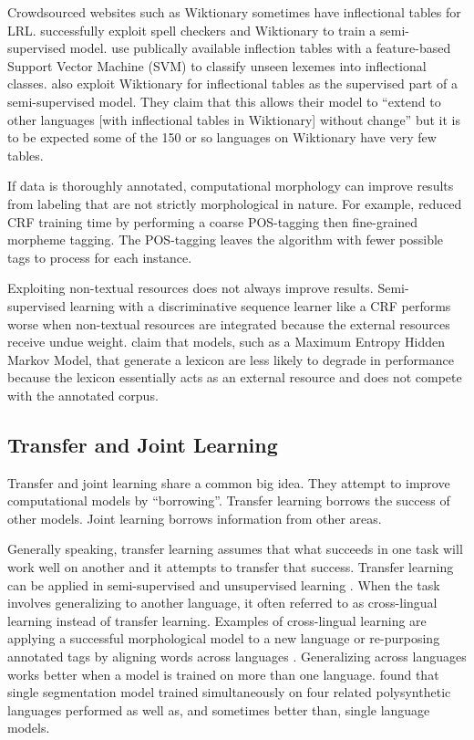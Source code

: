 \documentclass[12pt]{article}
\begin{document}
Crowdsourced websites such as Wiktionary sometimes have inflectional tables for LRL.  successfully exploit spell checkers and Wiktionary to train a semi-supervised model.  use publically available inflection tables with a feature-based Support Vector Machine (SVM) to classify unseen lexemes into inflectional classes.  also exploit Wiktionary for inflectional tables as the supervised part of a semi-supervised model. They claim that this allows their model to ``extend to other languages [with inflectional tables in Wiktionary] without change'' but it is to be expected some of the 150 or so languages on Wiktionary have very few tables. 

If data is thoroughly annotated, computational morphology can improve results from labeling that are not strictly morphological in nature. For example,  reduced CRF training time by performing a coarse POS-tagging then fine-grained morpheme tagging. The POS-tagging leaves the algorithm with fewer possible tags to process for each instance. 

Exploiting non-textual resources does not always improve results. Semi-supervised learning with a discriminative sequence learner like a CRF performs worse when non-textual resources are integrated because the external resources receive undue weight.  claim that models, such as a Maximum Entropy Hidden Markov Model, that generate a lexicon are less likely to degrade in performance because the lexicon essentially acts as an external resource and does not compete with the annotated corpus. 

\subsection{Transfer and Joint Learning}
\label{transfer}

Transfer and joint learning share a common big idea. They attempt to improve computational models by ``borrowing''. Transfer learning borrows the success of other models. Joint learning borrows information from other areas. 

Generally speaking, transfer learning assumes that what succeeds in one task will work well on another and it attempts to transfer that success. Transfer learning can be applied in semi-supervised and unsupervised learning \cite{duong_natural_2017}. When the task involves generalizing to another language, it often referred to as cross-lingual learning instead of transfer learning. Examples of cross-lingual learning are applying a successful morphological model to a new language or re-purposing annotated tags by aligning words across languages \cite{duong_natural_2017}. Generalizing across languages works better when a model is trained on more than one language.  found that single segmentation model trained simultaneously on four related polysynthetic languages performed as well as, and sometimes better than, single language models.
\end{document}

